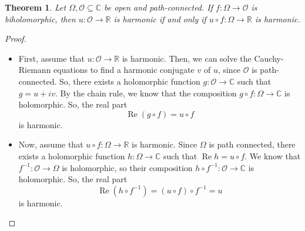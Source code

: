 \documentclass[a4paper, openany]{memoir}
\theoremstyle{definition}
\theoremstyle{plain}
\newtheorem{theorem}[definition]{Theorem}
\begin{document}
\begin{theorem}
    Let $\Omega, \mathcal{O} \subseteq \mathbb{C}$ be open and path-connected. If $f: \Omega \to \mathcal{O}$ is biholomorphic, then $u: \mathcal{O} \to \mathbb{R}$ is harmonic if and only if $u \circ f: \Omega \to \mathbb{R}$ is harmonic.
\end{theorem}
\begin{proof}
    \hspace*{0pt}
    \begin{itemize}
        \item First, assume that $u: \mathcal{O} \to \mathbb{R}$ is harmonic. Then, we can solve the Cauchy-Riemann equations to find a harmonic conjugate $v$ of $u$, since $\mathcal{O}$ is path-connected. So, there exists a holomorphic function $g: \mathcal{O} \to \mathbb{C}$ such that $g = u + iv$. By the chain rule, we know that the composition $g \circ f: \Omega \to \mathbb{C}$ is holomorphic. So, the real part
        \[\operatorname{Re}(g \circ f) = u \circ f\]
        is harmonic.
    
        \item Now, assume that $u \circ f: \Omega \to \mathbb{R}$ is harmonic. Since $\Omega$ is path connected, there exists a holomorphic function $h: \Omega \to \mathbb{C}$ such that $\operatorname{Re} h = u \circ f$. We know that $f^{-1}: \mathcal{O} \to \Omega$ is holomorphic, so their composition $h \circ f^{-1}: \mathcal{O} \to \mathbb{C}$ is holomorphic. So, the real part
        \[\operatorname{Re}(h \circ f^{-1}) = (u \circ f) \circ f^{-1} = u\]
        is harmonic.        
    \end{itemize}
\end{proof}
\end{document}
